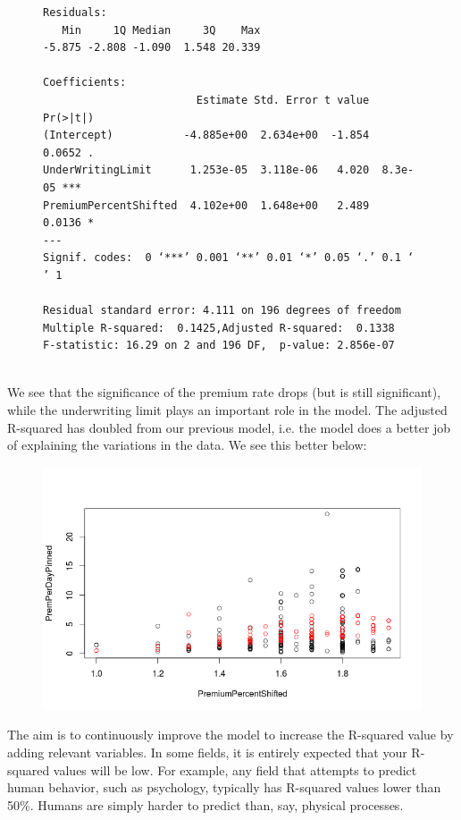 \documentclass{article}
\begin{document}
\begin{figure}[H]
\begin{center}
\begin{BVerbatim}
Residuals:
   Min     1Q Median     3Q    Max 
-5.875 -2.808 -1.090  1.548 20.339 

Coefficients:
                        Estimate Std. Error t value Pr(>|t|)    
(Intercept)           -4.885e+00  2.634e+00  -1.854   0.0652 .  
UnderWritingLimit      1.253e-05  3.118e-06   4.020  8.3e-05 ***
PremiumPercentShifted  4.102e+00  1.648e+00   2.489   0.0136 *  
---
Signif. codes:  0 ‘***’ 0.001 ‘**’ 0.01 ‘*’ 0.05 ‘.’ 0.1 ‘ ’ 1

Residual standard error: 4.111 on 196 degrees of freedom
Multiple R-squared:  0.1425,Adjusted R-squared:  0.1338 
F-statistic: 16.29 on 2 and 196 DF,  p-value: 2.856e-07
\end{BVerbatim}
\end{center}
\end{figure}
~\\
We see that the significance of the premium rate drops (but is still significant), while the underwriting limit 
plays an important role in the model.  The adjusted R-squared has doubled from our previous model, i.e. the model
does a better job of explaining the variations in the data.  We see this better below:

\begin{figure}[H]
\centering
\includegraphics[width=0.45\paperwidth]{pinnedPremPerDayWithUWL.png}
\end{figure}

The aim is to continuously improve the model to increase the R-squared 
value by adding relevant variables. In some fields, it is entirely expected 
that your R-squared values will be low. For example, any field that attempts 
to predict human behavior, such as psychology, typically has R-squared values 
lower than 50\%. Humans are simply harder to predict than, say, physical processes.
\end{document}
